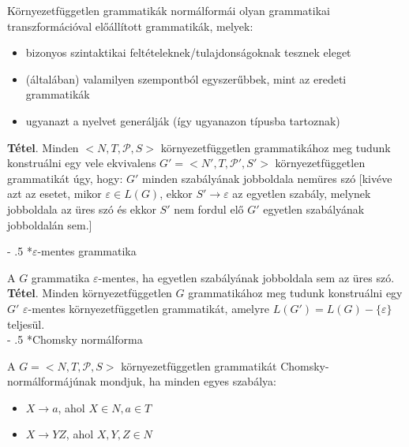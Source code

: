 \documentclass[12pt,margin=0px]{article}
\makeatletter
\renewcommand\paragraph{%
	\@startsection{paragraph}{4}{0mm}%
	{-\baselineskip}%
	{.5\baselineskip}%
	{\normalfont\normalsize\bfseries}}
\makeatother
\begin{document}
	\noindent Környezetfüggetlen grammatikák normálformái olyan grammatikai transzformációval előállított  grammatikák, melyek:
	\begin{itemize}
		\item bizonyos szintaktikai feltételeknek/tulajdonságoknak tesznek eleget
		\item (általában) valamilyen szempontból egyszerűbbek, mint az eredeti grammatikák
		\item ugyanazt a nyelvet generálják (így ugyanazon típusba tartoznak)
	\end{itemize}
	
    \noindent \textbf{Tétel}. Minden $\Big<N,T,\mathcal{P},S\Big>$ környezetfüggetlen grammatikához meg tudunk konstruálni egy vele ekvivalens $G' = \Big<N',T,\mathcal{P}',S'\Big>$ környezetfüggetlen grammatikát úgy, hogy: $G'$ minden szabályának jobboldala nemüres szó [kivéve azt az esetet, mikor $\varepsilon \in L(G)$, ekkor $S' \rightarrow \varepsilon$ az egyetlen szabály, melynek jobboldala az üres szó és ekkor $S'$ nem fordul elő $G'$ egyetlen szabályának jobboldalán sem.]
	
    \paragraph*{$\varepsilon$-mentes grammatika}

    \noindent A $G$ grammatika $\varepsilon$-mentes, ha egyetlen szabályának jobboldala sem az üres szó.\\
							
    \noindent \textbf{Tétel}. Minden környezetfüggetlen $G$ grammatikához meg tudunk konstruálni egy $G'$ $\varepsilon$-mentes környezetfüggetlen grammatikát, amelyre $L(G') = L(G) - \{\varepsilon\}$ teljesül.\\

    \paragraph*{Chomsky normálforma}

	\noindent A $G = \Big<N,T,\mathcal{P},S\Big>$ környezetfüggetlen grammatikát Chomsky-normálformájúnak mondjuk, ha minden egyes szabálya:
	\begin{itemize}
        \item $X \rightarrow a$, ahol $X \in N, a \in T$
        \item $X \rightarrow YZ$, ahol $X,Y,Z \in N$
    \end{itemize}
	
\end{document}
